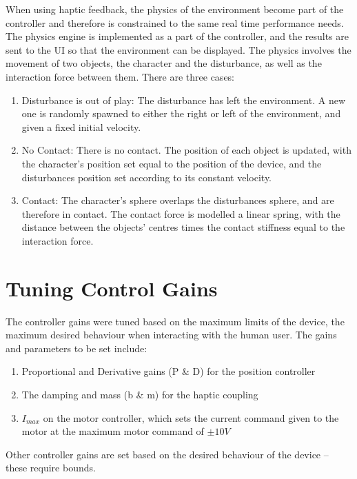 \documentclass[12pt]{report}
\begin{document}
When using haptic feedback, the physics of the environment become part of the controller and therefore is constrained to the same real time performance needs. The physics engine is implemented as a part of the controller, and the results are sent to the UI so that the environment can be displayed. The physics involves the movement of two objects, the character and the disturbance, as well as the interaction force between them. There are three cases:

\begin{enumerate}
	\item Disturbance is out of play: The disturbance has left the environment. A new one is randomly spawned to either the right or left of the environment, and given a fixed initial velocity.
	\item No Contact: There is no contact. The position of each object is updated, with the character's position set equal to the position of the device, and the disturbances position set according to its constant velocity. 
	\item Contact: The character's sphere overlaps the disturbances sphere, and are therefore in contact. The contact force is modelled a linear spring, with the distance between the objects' centres times the contact stiffness equal to the interaction force. 
\end{enumerate}

	
	\section{Tuning Control Gains}

	The controller gains were tuned based on the maximum limits of the  device, the maximum desired behaviour when interacting with the human user. The gains and parameters to be set include:
	
	\begin{enumerate}
		\item Proportional and Derivative gains (P \& D) for the position controller 
		\item The damping and mass (b \& m) for the haptic coupling 
		\item $I_{max}$ on the motor controller, which sets the current command given to the motor at the maximum motor command of $\pm 10V$
	\end{enumerate}		
	
	Other controller gains are set based on the desired behaviour of the device -- these require bounds. 
	
\end{document}

